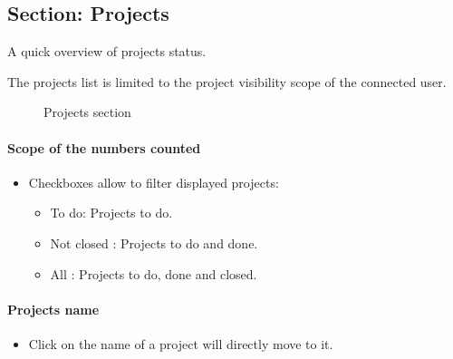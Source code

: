 \documentclass[letterpaper,10pt,english]{sphinxmanual}
\begin{document}
\subsection{Section: Projects}
\label{Today:section-projects}
A quick overview of projects status.

The projects list is limited to the project visibility scope of the connected user.
\begin{figure}[htbp]
\centering
\capstart

\caption{Projects section}\end{figure}
\paragraph{Scope of the numbers counted}
\begin{itemize}
\item {} 
Checkboxes allow to filter displayed projects: 
\begin{itemize}
\item {} 
To do: Projects to do.

\item {} 
Not closed : Projects to do and done.

\item {} 
All : Projects to do, done and closed.

\end{itemize}

\end{itemize}
\paragraph{Projects name}
\begin{itemize}
\item {} 
Click on the name of a project will directly move to it.

\end{itemize}
\end{document}
